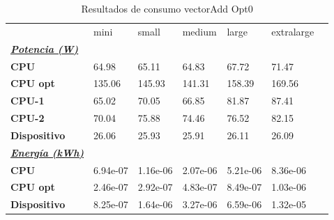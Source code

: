 \begin{table}[H]
    \centering
    \begin{tabular}{lllllll}
    \rowcolor[HTML]{DAE8FC} \ & mini & small & medium & 	large & 	extralarge \\
    \cellcolor[HTML]{DAE8FC} \textbf{\textbf{{\emph{{\underline{{Potencia (W)}}}}}}} &  &  &  & 	 & 	 \\
    \rowcolor[HTML]{EFEFEF} \cellcolor[HTML]{DAE8FC} \textbf{CPU} & 64.98 & 65.11 & 64.83 & 	67.72 & 	71.47 \\
    \cellcolor[HTML]{DAE8FC} \textbf{CPU opt} & 135.06 & 145.93 & 141.31 & 	158.39 & 	169.56 \\
    \rowcolor[HTML]{EFEFEF} \cellcolor[HTML]{DAE8FC} \textbf{\quad CPU-1} & 65.02 & 70.05 & 66.85 & 	81.87 & 	87.41 \\
    \cellcolor[HTML]{DAE8FC} \textbf{\quad CPU-2} & 70.04 & 75.88 & 74.46 & 	76.52 & 	82.15 \\
    \rowcolor[HTML]{EFEFEF} \cellcolor[HTML]{DAE8FC} \textbf{Dispositivo} & 26.06 & 25.93 & 25.91 & 	26.11 & 	26.09 \\
    \cellcolor[HTML]{DAE8FC} \textbf{\textbf{{\emph{{\underline{{Energía (kWh)}}}}}}} &  &  &  & 	 & 	 \\
    \rowcolor[HTML]{EFEFEF} \cellcolor[HTML]{DAE8FC} \textbf{CPU} & 6.94e-07 & 1.16e-06 & 2.07e-06 & 	5.21e-06 & 	8.36e-06 \\
    \cellcolor[HTML]{DAE8FC} \textbf{CPU opt} & 2.46e-07 & 2.92e-07 & 4.83e-07 & 	8.49e-07 & 	1.03e-06 \\
    \rowcolor[HTML]{EFEFEF} \cellcolor[HTML]{DAE8FC} \textbf{Dispositivo} & 8.25e-07 & 1.64e-06 & 3.27e-06 & 	6.59e-06 & 	1.32e-05 \\
    \end{tabular}
    \caption[Resultados de consumo vectorAdd Opt0]{{Resultados de consumo vectorAdd Opt0}}
    \label{table_test_vectorAdd_Opt0_hw_powerResults}
\end{table}